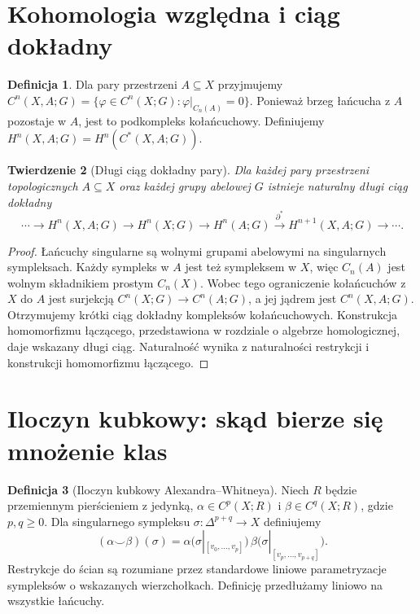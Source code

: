 \documentclass[11pt,a4paper,oneside]{report}
\theoremstyle{plain}
\newtheorem{twierdzenie}{Twierdzenie}[section]
\theoremstyle{definition}
\newtheorem{definicja}[twierdzenie]{Definicja}
\theoremstyle{remark}
\begin{document}
\section{Kohomologia względna i ciąg dokładny}

\begin{definicja}
Dla pary przestrzeni $A\subseteq X$ przyjmujemy
$C^n(X,A;G)=\{\varphi\in C^n(X;G):\varphi|_{C_n(A)}=0\}$.
Ponieważ brzeg łańcucha z $A$ pozostaje w $A$, jest to podkompleks
kołańcuchowy. Definiujemy $H^n(X,A;G)=H^n(C^*(X,A;G))$.
\end{definicja}

\begin{twierdzenie}[Długi ciąg dokładny pary]
Dla każdej pary przestrzeni topologicznych $A\subseteq X$ oraz
każdej grupy abelowej $G$ istnieje naturalny długi ciąg dokładny
\[
\cdots\to H^n(X,A;G)\to H^n(X;G)\to H^n(A;G)
\xrightarrow{\,\partial^*\,}H^{n+1}(X,A;G)\to\cdots.
\]
\end{twierdzenie}
\begin{proof}
Łańcuchy singularne są wolnymi grupami abelowymi na singularnych
sympleksach. Każdy sympleks w $A$ jest też sympleksem w $X$, więc
$C_n(A)$ jest wolnym składnikiem prostym $C_n(X)$.
Wobec tego ograniczenie kołańcuchów z $X$ do $A$ jest surjekcją
$C^n(X;G)\to C^n(A;G)$, a jej jądrem jest $C^n(X,A;G)$.
Otrzymujemy krótki ciąg dokładny kompleksów kołańcuchowych.
Konstrukcja homomorfizmu łączącego, przedstawiona w rozdziale
o algebrze homologicznej, daje wskazany długi ciąg. Naturalność
wynika z naturalności restrykcji i konstrukcji homomorfizmu łączącego.
\end{proof}

\section{Iloczyn kubkowy: skąd bierze się mnożenie klas}

\begin{definicja}[Iloczyn kubkowy Alexandra--Whitneya]
Niech $R$ będzie przemiennym pierścieniem z jedynką,
$\alpha\in C^p(X;R)$ i $\beta\in C^q(X;R)$, gdzie $p,q\geq0$.
Dla singularnego sympleksu $\sigma:\Delta^{p+q}\to X$ definiujemy
\[
(\alpha\smile\beta)(\sigma)=
\alpha\bigl(\sigma|_{[v_0,\ldots,v_p]}\bigr)\,
\beta\bigl(\sigma|_{[v_p,\ldots,v_{p+q}]}\bigr).
\]
Restrykcje do ścian są rozumiane przez standardowe liniowe
parametryzacje sympleksów o wskazanych wierzchołkach.
Definicję przedłużamy liniowo na wszystkie łańcuchy.
\end{definicja}
\end{document}
